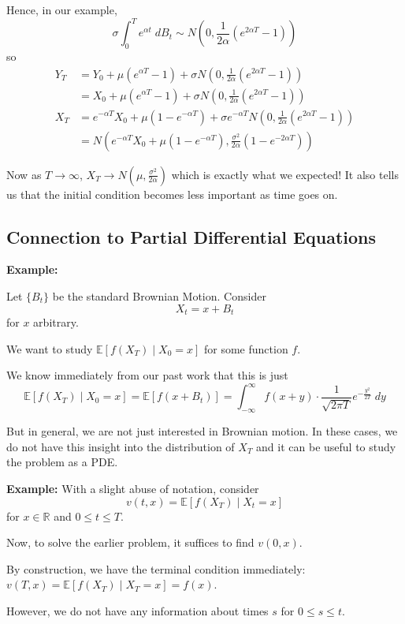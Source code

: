\documentclass[12pt]{report}
\newcommand{\R}{\mathbb{R}}
\newcommand{\E}{\mathbb{E}}
\newcommand*{\tbf}[1]{\ifmmode\mathbf{#1}\else\textbf{#1}\fi}
\begin{document}
    Hence, in our example, 
    \[\sigma \int_0^T e^{\alpha t}\; dB_t \sim N\left(0, \frac{1}{2\alpha} (e^{2\alpha T} - 1)\right)\]
    so 
    \begin{align*}
        Y_T &= Y_0 + \mu(e^{\alpha T} - 1) + \sigma N(0, \frac{1}{2\alpha} (e^{2\alpha T} - 1))\\ 
            &= X_0 + \mu(e^{\alpha T} - 1) + \sigma N(0, \frac{1}{2\alpha} (e^{2\alpha T} - 1))\\ 
        X_T &= e^{-\alpha T} X_0 + \mu(1 - e^{-\alpha T}) + \sigma e^{-\alpha T} N(0, \frac{1}{2\alpha} (e^{2\alpha T} - 1))\\ 
            &= N\left(e^{-\alpha T}X_0 + \mu(1- e^{-\alpha T}), \frac{\sigma^2}{2\alpha}(1 - e^{-2\alpha T})\right)
    \end{align*}

    Now as $T \to \infty$, $X_T \to N(\mu, \frac{\sigma^2}{2\alpha})$ which is exactly what we expected! It also tells us that the initial condition becomes less important as time goes on.

\subsection{Connection to Partial Differential Equations}
    \tbf{Example:}

    Let $\{B_t\}$ be the standard Brownian Motion. Consider 
    \[X_t = x + B_t\]
    for $x$ arbitrary. 

    We want to study $\E[f(X_T) \; | \; X_0 = x]$ for some function $f$.

    We know immediately from our past work that this is just 
    \[\E[f(X_T) \; | \; X_0 = x] = \E[f(x + B_t)] = \int_{-\infty}^{\infty} f(x+ y) \cdot \frac{1}{\sqrt{2\pi T}} e^{-\frac{y^2}{2T}}\; dy\]

    But in general, we are not just interested in Brownian motion. In these cases, we do not have this insight into the distribution of $X_T$ and it can be useful to study the problem as a PDE. 

    \tbf{Example:} With a slight abuse of notation, consider 
    \[v(t, x) = \E[f(X_T) \; | \; X_t = x]\]
    for $x \in \R$ and $0 \leq t \leq T$. 

    Now, to solve the earlier problem, it suffices to find $v(0, x)$.
    
    By construction, we have the terminal condition immediately: $v(T, x) = \E[f(X_T) \; | \; X_T = x] = f(x)$.

    However, we do not have any information about times $s$ for $0 \leq s \leq t$. 
\end{document}
